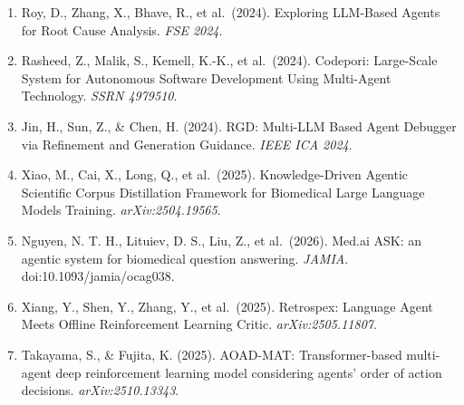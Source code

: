 \begin{enumerate}
\item
  Roy, D., Zhang, X., Bhave, R., et al.~(2024). Exploring LLM-Based Agents for Root Cause Analysis. \emph{FSE 2024}.
\item
  Rasheed, Z., Malik, S., Kemell, K.-K., et al.~(2024). Codepori: Large-Scale System for Autonomous Software Development Using Multi-Agent Technology. \emph{SSRN 4979510}.
\item
  Jin, H., Sun, Z., \& Chen, H. (2024). RGD: Multi-LLM Based Agent Debugger via Refinement and Generation Guidance. \emph{IEEE ICA 2024}.
\item
  Xiao, M., Cai, X., Long, Q., et al.~(2025). Knowledge-Driven Agentic Scientific Corpus Distillation Framework for Biomedical Large Language Models Training. \emph{arXiv:2504.19565}.
\item
  Nguyen, N. T. H., Lituiev, D. S., Liu, Z., et al.~(2026). Med.ai ASK: an agentic system for biomedical question answering. \emph{JAMIA}. doi:10.1093/jamia/ocag038.
\item
  Xiang, Y., Shen, Y., Zhang, Y., et al.~(2025). Retrospex: Language Agent Meets Offline Reinforcement Learning Critic. \emph{arXiv:2505.11807}.
\item
  Takayama, S., \& Fujita, K. (2025). AOAD-MAT: Transformer-based multi-agent deep reinforcement learning model considering agents' order of action decisions. \emph{arXiv:2510.13343}.
\end{enumerate}

